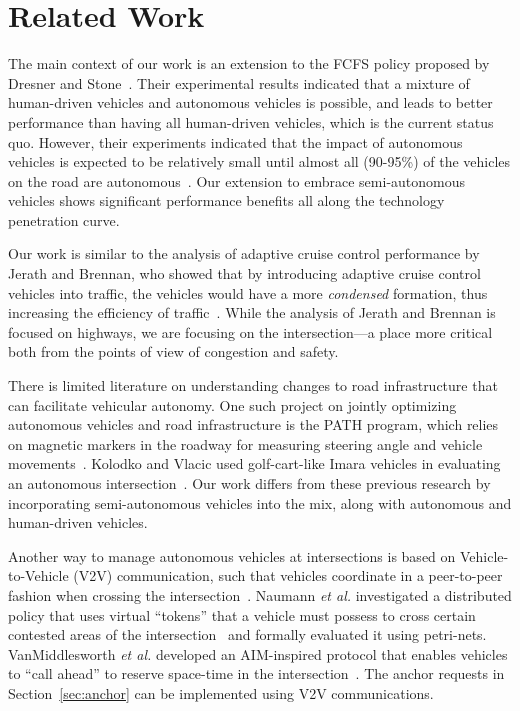 \section{Related Work}
\label{sec:related}

The main context of our work is an extension to the FCFS policy
proposed by Dresner and Stone~\cite{bib:Dresner08Multiagent}. Their
experimental results indicated that a mixture of human-driven vehicles
and autonomous vehicles is possible, and leads to better performance
than having all human-driven vehicles, which is the current status
quo.  However, their experiments indicated that the impact of
autonomous vehicles is expected to be relatively small until almost
all (90-95\%) of the vehicles on the road are
autonomous~\cite{bib:Dresner07Sharing}.  Our extension to embrace
semi-autonomous vehicles shows significant performance benefits all
along the technology penetration curve.

Our work is similar to the analysis of adaptive cruise control
performance by Jerath and Brennan, who showed that by introducing
adaptive cruise control vehicles into traffic, the vehicles would have
a more \textit{condensed} formation, thus increasing the efficiency of
traffic~\cite{bib:Jerath10adaptive}.  While the analysis of Jerath and
Brennan is focused on highways, we are focusing on the
intersection---a place more critical both from the points of view of
congestion and safety.

There is limited literature on understanding changes to road
infrastructure that can facilitate vehicular autonomy.  One such
project on jointly optimizing autonomous vehicles and road
infrastructure is the PATH program, which relies on magnetic markers
in the roadway for measuring steering angle and vehicle
movements~\cite{bib:Shladover91Automated}.  Kolodko and Vlacic used
golf-cart-like Imara vehicles in evaluating an autonomous
intersection~\cite{Kolodko03:INRIA}.  Our work differs from these
previous research by incorporating semi-autonomous vehicles into the
mix, along with autonomous and human-driven vehicles.

Another way to manage autonomous vehicles at intersections is based on
Vehicle-to-Vehicle (V2V) communication, such that vehicles coordinate
in a peer-to-peer fashion when crossing the
intersection~\cite{naumann97:intersection,ATT08-vanmiddlesworth}.
Naumann {\em et al.} investigated a distributed policy that uses
virtual ``tokens'' that a vehicle must possess to cross certain
contested areas of the intersection~\cite{naumann97:intersection} and
formally evaluated it using petri-nets.  VanMiddlesworth {\em et al.}
developed an AIM-inspired protocol that enables vehicles to ``call
ahead'' to reserve space-time in the
intersection~\cite{ATT08-vanmiddlesworth}.  The anchor requests in
Section~\ref{sec:anchor} can be implemented using V2V communications.


